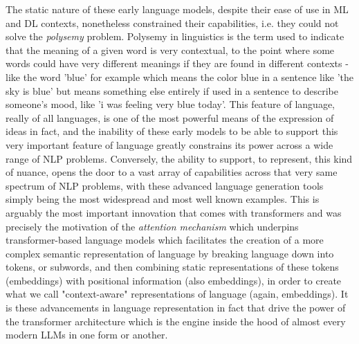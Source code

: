 \documentclass[final]{clv2025}
\begin{document}
The static nature of these early language models, despite their ease of use in ML and DL contexts, nonetheless constrained their capabilities, i.e. they could not solve the \textit{polysemy} problem. Polysemy in linguistics is the term used to indicate that the meaning of a given word is very contextual, to the point where some words could have very different meanings if they are found in different contexts - like the word 'blue' for example which means the color blue in a sentence like 'the sky is blue' but means something else entirely if used in a sentence to describe someone's mood, like 'i was feeling very blue today'. This feature of language, really of all languages, is one of the most powerful means of the expression of ideas in fact, and the inability of these early models to be able to support this very important feature of language greatly constrains its power across a wide range of NLP problems. Conversely, the ability to support, to represent, this kind of nuance, opens the door to a vast array of capabilities across that very same spectrum of NLP problems, with these advanced language generation tools simply being the most widespread and most well known examples. This is arguably the most important innovation that comes with transformers and was precisely the motivation of the \textit{attention mechanism} \cite{bahdanau2016neuralmachinetranslationjointly} \cite{vaswani} which underpins transformer-based language models which facilitates the creation of a more complex semantic representation of language by breaking language down into tokens, or subwords, and then combining static representations of these tokens (embeddings) with positional information (also embeddings), in order to create what we call "context-aware" representations of language (again, embeddings). It is these advancements in language representation in fact that drive the power of the transformer architecture \cite{vaswani} which is the engine inside the hood of almost every modern LLMs in one form or another. 
\end{document}
